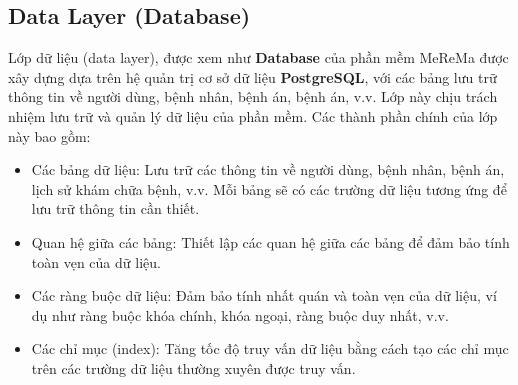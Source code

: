 \subsection{Data Layer (Database)}

Lớp dữ liệu (data layer), được xem như \textbf{Database} của phần mềm MeReMa được xây dựng dựa trên hệ quản trị cơ sở dữ liệu \textbf{PostgreSQL}, với các bảng lưu trữ thông tin về người dùng, bệnh nhân, bệnh án, bệnh án, v.v. Lớp này chịu trách nhiệm lưu trữ và quản lý dữ liệu của phần mềm. Các thành phần chính của lớp này bao gồm:
\begin{itemize}
  \item Các bảng dữ liệu: Lưu trữ các thông tin về người dùng, bệnh nhân, bệnh án, lịch sử khám chữa bệnh, v.v. Mỗi bảng sẽ có các trường dữ liệu tương ứng để lưu trữ thông tin cần thiết.
  \item Quan hệ giữa các bảng: Thiết lập các quan hệ giữa các bảng để đảm bảo tính toàn vẹn của dữ liệu.
  \item Các ràng buộc dữ liệu: Đảm bảo tính nhất quán và toàn vẹn của dữ liệu, ví dụ như ràng buộc khóa chính, khóa ngoại, ràng buộc duy nhất, v.v.
  \item Các chỉ mục (index): Tăng tốc độ truy vấn dữ liệu bằng cách tạo các chỉ mục trên các trường dữ liệu thường xuyên được truy vấn.
\end{itemize}